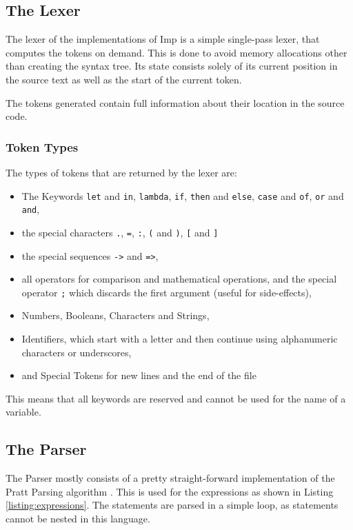 \documentclass[12pt]{article}
\newcommand{\importListing}[1]{
    \begin{minipage}{\textwidth}
    
    \end{minipage}
}
\begin{document}
\subsection{The Lexer}
The lexer of the implementations of Imp is a simple single-pass lexer, that computes
the tokens on demand. This is done to avoid memory
allocations other than creating the syntax tree.
Its state consists solely of its
current position in the source text as well as the start
of the current token.

The tokens generated contain full information
about their location in the source code.

\subsubsection{Token Types}
The types of tokens that are returned by the lexer are:
\begin{itemize}
	\item The Keywords \texttt{let} and \texttt{in}, \texttt{lambda}, \texttt{if}, \texttt{then} and \texttt{else},
	      \texttt{case} and \texttt{of}, \texttt{or} and \texttt{and},
	\item the special characters \texttt{.}, \texttt{=}, \texttt{:}, \texttt{(} and \texttt{)}, \texttt{[} and \texttt{]}
	\item the special sequences \texttt{->} and \texttt{=>},
	\item all operators for comparison and mathematical operations,
	      and the special operator \texttt{;} which discards the first argument (useful for side-effects),
	\item Numbers, Booleans, Characters and Strings,
	\item Identifiers, which start with a letter and
	      then continue using alphanumeric characters or underscores,
	\item and Special Tokens for new lines and the end of the file
\end{itemize}

This means that all keywords are reserved and cannot be used
for the name of a variable.

\subsection{The Parser}
\importListing{code/expressions.tex}

The Parser mostly consists of a pretty straight-forward implementation of the Pratt Parsing algorithm
\autocite{prattTopOperatorPrecedence1973}.
This is used for the expressions as shown in Listing \ref{listing:expressions}.
The statements are parsed in a simple loop, as statements cannot be nested in this language.
\end{document}
